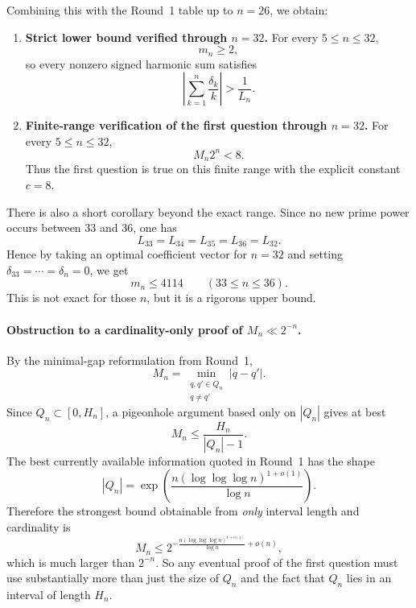 Combining this with the Round~1 table up to $n=26$, we obtain:
\begin{enumerate}
\item \textbf{Strict lower bound verified through $n=32$.}
For every $5\le n\le 32$,
\[
m_n\ge 2,
\]
so every nonzero signed harmonic sum satisfies
\[
\left|\sum_{k=1}^n \frac{\delta_k}{k}\right|>\frac1{L_n}.
\]
\item \textbf{Finite-range verification of the first question through $n=32$.}
For every $5\le n\le 32$,
\[
M_n 2^n<8.
\]
Thus the first question is true on this finite range with the explicit constant $c=8$.
\end{enumerate}

There is also a short corollary beyond the exact range.  Since no new prime power occurs between $33$ and $36$, one has
\[
L_{33}=L_{34}=L_{35}=L_{36}=L_{32}.
\]
Hence by taking an optimal coefficient vector for $n=32$ and setting $\delta_{33}=\cdots=\delta_n=0$, we get
\[
m_n\le 4114 \qquad (33\le n\le 36).
\]
This is not exact for those $n$, but it is a rigorous upper bound.

\paragraph{Obstruction to a cardinality-only proof of $M_n\ll 2^{-n}$.}
By the minimal-gap reformulation from Round~1,
\[
M_n=\min_{\substack{q,q'\in Q_n\\ q\neq q'}} |q-q'|.
\]
Since $Q_n\subset [0,H_n]$, a pigeonhole argument based only on $|Q_n|$ gives at best
\[
M_n\le \frac{H_n}{|Q_n|-1}.
\]
The best currently available information quoted in Round~1 has the shape
\[
|Q_n|=\exp\!\left(\frac{n(\log\log\log n)^{1+o(1)}}{\log n}\right).
\]
Therefore the strongest bound obtainable from \emph{only} interval length and cardinality is
\[
M_n\le 2^{-\frac{n(\log\log\log n)^{1+o(1)}}{\log n}+o(n)},
\]
which is much larger than $2^{-n}$.  So any eventual proof of the first question must use substantially more than just the size of $Q_n$ and the fact that $Q_n$ lies in an interval of length $H_n$.

